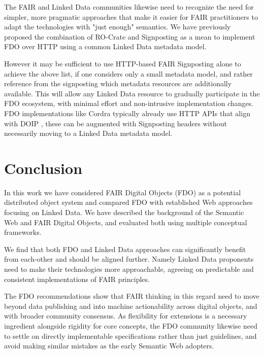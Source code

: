 \documentclass[fleqn,10pt,NOlineno]{wlpeerjlua}
\begin{document}
The FAIR and Linked Data communities likewise need to recognize the need for simpler, more pragmatic approaches that make it easier for FAIR practitioners to adapt the technologies with "just enough" semantics. 
We have previously proposed the combination of RO-Crate \autocite{10.3233/ds-210053} and Signposting \autocite{vandesompelFAIRSignpostingProfile2022} as a mean to implement FDO \autocite{10.3897/rio.8.e93937} over HTTP using a common Linked Data metadata model. 

However it may be sufficient to use HTTP-based FAIR Signposting alone to achieve the above list, if one considers only a small metadata model, and rather reference from the signposting which metadata resources are additionally available. 
This will allow any Linked Data resource to gradually participate in the FDO ecosystem, with minimal effort and non-intrusive implementation changes. FDO implementations like Cordra typically already use HTTP APIs that align with DOIP \autocite{DOIPAPIHTTPa}, these can be augmented with Signposting headers without necessarily moving to a Linked Data metadata model. 


\hypertarget{conclusion}{%
\section*{Conclusion}\label{conclusion}}

In this work we have considered FAIR Digital Objects (FDO) as a potential distributed object system and compared FDO with established Web approaches focusing on Linked Data. We have described the background of the Semantic Web and FAIR Digital Objects, and evaluated both using multiple conceptual frameworks.

We find that both FDO and Linked Data approaches can significantly benefit from each-other and should be aligned further. Namely Linked Data proponents need to make their technologies more approachable, agreeing on predictable and consistent implementations of FAIR principles. 

The FDO recommendations show that FAIR thinking in this regard need to move beyond data publishing and into machine actionability across digital objects, and with broader community consensus. 
As flexibility for extensions is a necessary ingredient alongside rigidity for core concepts, the FDO community likewise need to settle on directly implementable specifications rather than just guidelines, and avoid making similar mistakes as the early Semantic Web adopters. 
\end{document}
